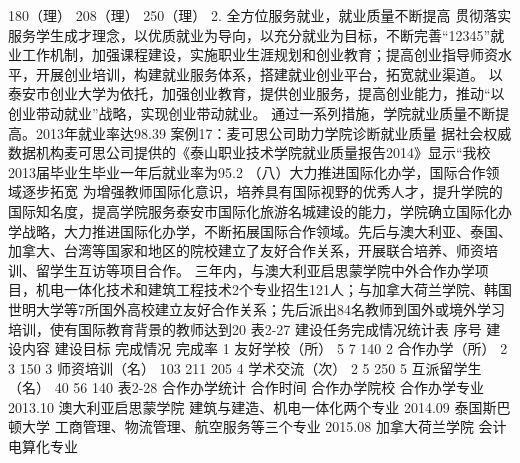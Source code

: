 180（理）
208（理）
250（理）
2. 全方位服务就业，就业质量不断提高
贯彻落实服务学生成才理念，以优质就业为导向，以充分就业为目标，不断完善“12345”就业工作机制，加强课程建设，实施职业生涯规划和创业教育；提高创业指导师资水平，开展创业培训，构建就业服务体系，搭建就业创业平台，拓宽就业渠道。
以泰安市创业大学为依托，加强创业教育，提供创业服务，提高创业能力，推动“以创业带动就业”战略，实现创业带动就业。
通过一系列措施，学院就业质量不断提高。2013年就业率达98.39%
案例17：麦可思公司助力学院诊断就业质量
据社会权威数据机构麦可思公司提供的《泰山职业技术学院就业质量报告2014》显示“我校2013届毕业生毕业一年后就业率为95.2%
（八）大力推进国际化办学，国际合作领域逐步拓宽
为增强教师国际化意识，培养具有国际视野的优秀人才，提升学院的国际知名度，提高学院服务泰安市国际化旅游名城建设的能力，学院确立国际化办学战略，大力推进国际化办学，不断拓展国际合作领域。先后与澳大利亚、泰国、加拿大、台湾等国家和地区的院校建立了友好合作关系，开展联合培养、师资培训、留学生互访等项目合作。
三年内，与澳大利亚启思蒙学院中外合作办学项目，机电一体化技术和建筑工程技术2个专业招生121人；与加拿大荷兰学院、韩国世明大学等7所国外高校建立友好合作关系；先后派出84名教师到国外或境外学习培训，使有国际教育背景的教师达到20%
表2-27  建设任务完成情况统计表
序号
建设内容
建设目标
完成情况
完成率
1
友好学校（所）
5 
7 
140%
2
合作办学（所）
2 
3 
150%
3
师资培训（名）
103 
211 
205%
4
学术交流（次）
2 
5 
250%
5
互派留学生（名）
40 
56 
140%
表2-28  合作办学统计
合作时间
合作办学院校
合作办学专业
2013.10
澳大利亚启思蒙学院
建筑与建造、机电一体化两个专业
2014.09
泰国斯巴顿大学
工商管理、物流管理、航空服务等三个专业
2015.08
加拿大荷兰学院
会计电算化专业



